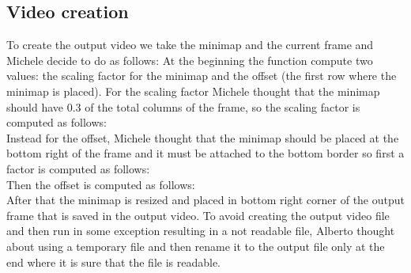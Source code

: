 \subsection{Video creation}
To create the output video we take the minimap and the current frame and Michele decide to do as follows:
At the beginning the function compute two values: the scaling factor for the minimap and the offset
(the first row where the minimap is placed). For the scaling factor Michele thought that
the minimap should have 0.3 of the total columns of the frame, so the scaling factor is computed as follows:
\begin{equation}
\end{equation}
Instead for the offset, Michele thought that the minimap should be placed at the bottom right of the frame
and it must be attached to the bottom border so first a factor is computed as follows:
\begin{equation}
\end{equation}
Then the offset is computed as follows:
\begin{equation}
\end{equation}
After that the minimap is resized and placed in bottom right corner of the output frame that
is saved in the output video.
To avoid creating the output video file and then run in some exception resulting in a not readable file,
Alberto thought about using a temporary file and then rename it to the output file only at the end where
it is sure that the file is readable.
